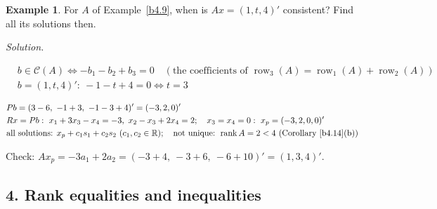 \documentclass[12pt]{article}
\newcommand{\R}{\mathbb R}
\DeclareMathOperator{\rank}{rank}
\theoremstyle{definition}
\newtheorem{example}[theorem]{Example}
\newcommand{\boardtop}{\vspace*{-\abovedisplayskip}}
\DeclareMathOperator{\row}{row}
\begin{document}
\begin{example}\label{b4.30}
For \(A\) of Example~\ref{b4.9}, when is \(Ax=(1,t,4)'\) consistent? Find all its solutions then.
\end{example}
\textit{Solution.}
\begin{board}[Example~\ref{b4.9}: \(r=2\), \(\row_3(P)=(-1,-1,1)\); the equations of \(\mathcal C(A)\):]
\boardtop
\begin{align*}
&b\in\mathcal C(A)\iff-b_1-b_2+b_3=0\quad(\text{the coefficients of }\row_3(A)=\row_1(A)+\row_2(A))\\
&b=(1,t,4)':\ -1-t+4=0\iff t=3
\end{align*}
\end{board}
\begin{board}[\(t=3\), \(b=(1,3,4)'\); \(Ax=b\iff Rx=Pb\) (\lec{2}, \lit{Theorem~3}(b)); all solutions \(x_p+z\),
\(z\in\mathcal N(A)\) (\lec{2}, \lit{Theorem~22}(a)), and Theorem~\ref{b4.8}(c):]
\boardtop
\begin{align*}
&Pb=(3-6,\ -1+3,\ -1-3+4)'=(-3,2,0)'\\
&Rx=Pb:\ x_1+3x_3-x_4=-3,\ x_2-x_3+2x_4=2;\quad x_3=x_4=0:\ x_p=(-3,2,0,0)'\\
&\text{all solutions: }x_p+c_1s_1+c_2s_2\ (c_1,c_2\in\R);\quad\text{not unique: }\rank A=2<4\ \text{(Corollary~\ref{b4.14}(b))}
\end{align*}
\end{board}
Check: \(Ax_p=-3a_1+2a_2=(-3+4,\ -3+6,\ -6+10)'=(1,3,4)'\).

\subsection*{4. Rank equalities and inequalities}
\end{document}
